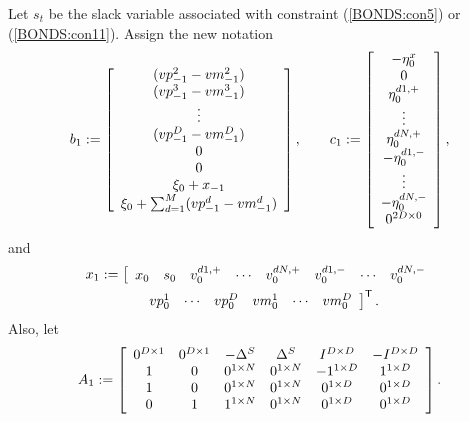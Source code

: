 Let $s_t$ be the slack variable associated with constraint (\ref{BONDS:con5}) or (\ref{BONDS:con11}).  Assign the new notation
\begin{equation*}
b_1 := \left[
\begin{array}{c}
	(vp_{-1}^2 - vm_{-1}^2)\\
	(vp_{-1}^3 - vm_{-1}^3)\\
	\vdots\\
	(vp_{-1}^D - vm_{-1}^D)\\
	0\\
	0\\
	\xi_0 + x_{-1}\\
	\xi_0 + \sum_{d=1}^M (vp_{-1}^d - vm_{-1}^d)
\end{array}
\right],\qquad
c_1 := \left[
\begin{array}{c}
	-\eta_0^x\\
	0\\
	\eta_0^{d1,+}\\
	\vdots\\
	\eta_0^{dN,+}\\
	-\eta_0^{d1,-}\\
	\vdots\\
	-\eta_0^{dN,-}\\
	0^{2 D \times 0}
\end{array}
\right],
\end{equation*}
and
\begin{multline*}
x_1 := \left[
\begin{array}{cccccccc}
	x_0&
	s_0&
	v_0^{d1,+}&
	\cdots&
	v_0^{dN,+}&
	v_0^{d1,-}&
	\cdots&
	v_0^{dN,-}
\end{array}
\right.\\
\left.
\begin{array}{cccccc}
	vp_0^1&
	\cdots&
	vp_0^D&
	vm_0^1&
	\cdots&
	vm_0^D
\end{array}
\right]^{\mbox{\scriptsize\sf T}}.
\end{multline*}
Also, let
\begin{equation*}
A_1 := \left[
\begin{array}{cccccc}
	0^{D\times 1}	&	0^{D\times 1}	&	-\Delta^S	&	\Delta^S	&	I^{D \times D}	&	-I^{D \times D}\\
	1	&	0	&	0^{1\times N}	&	0^{1\times N}	&	-1^{1\times D}	&	1^{1 \times D}\\
	1	&	0	&	0^{1\times N}	&	0^{1\times N}	&	0^{1\times D}	&	0^{1 \times D}\\
	0	&	1	&	1^{1\times N}	&	0^{1\times N}	&	0^{1 \times D}	&0^{1 \times D}
\end{array}
\right].
\end{equation*}


